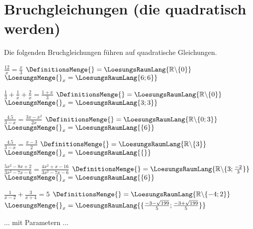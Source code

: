\platzFuerBerechnungenBisEndeSeite{}

\section{Bruchgleichungen (die quadratisch werden)}
Die folgenden Bruchgleichungen führen auf quadratische Gleichungen.


\begin{bbwAufgabenBlock}
\item $\frac{12}x = \frac{x}3$ \hspace{10mm}   $\DefinitionsMenge{}= \LoesungsRaumLang{\mathbb{R}\backslash\{0\}}$  $\LoesungsMenge{}_x = \LoesungsRaumLang{\-6; 6\}}$
\item $\frac13 + \frac1x + \frac2x = \frac{1+x}3$ \hspace{10mm}   $\DefinitionsMenge{}= \LoesungsRaumLang{\mathbb{R}\backslash\{0\}}$  $\LoesungsMenge{}_x = \LoesungsRaumLang{\-3; 3\}}$
\item $\frac{4.5}{3-x} = \frac{3x-x^2}{2x}$ \hspace{10mm}   $\DefinitionsMenge{}= \LoesungsRaumLang{\mathbb{R}\backslash\{0;3\}}$  $\LoesungsMenge{}_x = \LoesungsRaumLang{\{6\}}$\noTRAINER{\newpage}
\item $\frac{4.5}{3-x} = \frac{x-3}{2}$ \hspace{10mm}   $\DefinitionsMenge{}= \LoesungsRaumLang{\mathbb{R}\backslash\{3\}}$  $\LoesungsMenge{}_x = \LoesungsRaumLang{\{\}}$
\item $\frac{5x^2-8x+2}{3x^2-7x-6}=\frac{4x^2+x-16}{3x^2-7x-6}$ \hspace{10mm}   $\DefinitionsMenge{}= \LoesungsRaumLang{\mathbb{R}\backslash\{3;\frac{-2}3\}}$  $\LoesungsMenge{}_x = \LoesungsRaumLang{\{6\}}$
\item $\frac1{x-2} + \frac3{x+4} = 5$ \hspace{10mm}         $\DefinitionsMenge{}= \LoesungsRaumLang{\mathbb{R}\backslash\{-4;2\}}$          $\LoesungsMenge{}_x = \LoesungsRaumLang{\{\frac{-3-\sqrt{199}}{5};\frac{-3+\sqrt{199}}{5} \}}$

\end{bbwAufgabenBlock}

\platzFuerBerechnungenBisEndeSeite{}



... mit Parametern ...


